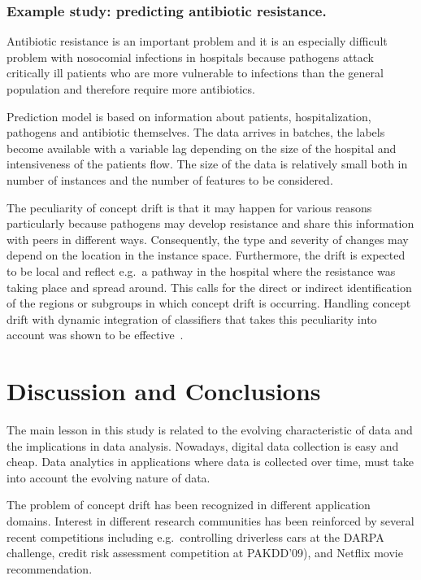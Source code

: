 \documentclass{llncs}
\begin{document}
\subsubsection{Example study: predicting antibiotic resistance.}

Antibiotic resistance is an important problem and it is an especially difficult problem with nosocomial infections in hospitals because pathogens
attack critically ill patients who are more vulnerable to infections than the general population and therefore require more antibiotics.

Prediction model is based on information about patients, hospitalization, pathogens and antibiotic themselves.
The data arrives in batches, the labels become available with a variable lag depending on the size of the hospital and intensiveness of the patients flow. The size of the data is relatively small both in number of instances and the number of features to be considered.

The peculiarity of concept drift is that it may happen for various reasons particularly because pathogens may develop resistance and share this information with peers in different ways. Consequently, the type and severity of changes may depend on the location in the instance space. Furthermore, the drift is expected to be local and reflect e.g.\ a pathway in the hospital where the resistance was taking place and spread around.
This calls for the direct or indirect identification of the regions or subgroups in which concept drift is occurring.
Handling concept drift with dynamic integration of classifiers that takes this peculiarity into account was shown to be effective~\cite{Tsymbal08}.


\section{Discussion and Conclusions}
\label{sec:conclusion}

The main lesson in this study is related to the evolving characteristic of data and the implications in data analysis.
Nowadays, digital data collection is easy and cheap. Data analytics in applications where data is collected over time,
must take into account the evolving nature of data.

The problem of concept drift has been recognized in different application domains. Interest in different research communities has been reinforced by several recent competitions including e.g.\ controlling driverless cars at the DARPA challenge, credit risk assessment competition at PAKDD'09), and Netflix movie recommendation.
\end{document}
